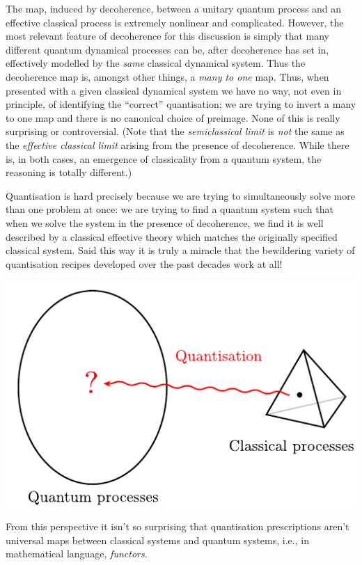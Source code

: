 \documentclass[11pt]{amsart}
\theoremstyle{plain}%
\theoremstyle{definition}
\theoremstyle{remark}
\begin{document}
The map, induced by decoherence, between a unitary quantum process and an effective classical process is extremely nonlinear and complicated. However, the most relevant feature of decoherence for this discussion is simply that many different quantum dynamical processes can be, after decoherence has set in, effectively modelled by the \emph{same} classical dynamical system. Thus the decoherence map is, amongst other things, a \emph{many to one} map. Thus, when presented with a given classical dynamical system we have no way, not even in principle, of identifying the ``correct'' quantisation; we are trying to invert a many to one map and there is no canonical choice of preimage.  None of this is really surprising or controversial. (Note that the \emph{semiclassical limit} is \emph{not} the same as the \emph{effective classical limit} arising from the presence of decoherence. While there is, in both cases, an emergence of classicality from a quantum system, the reasoning is totally different.)

Quantisation is hard precisely because we are trying to simultaneously solve more than one problem at once: we are trying to find a quantum system such that when we solve the system in the presence of decoherence, we find it is well described by a classical effective theory which matches the originally specified classical system. Said this way it is truly a miracle that the bewildering variety of quantisation recipes developed over the past decades work at all! 
\begin{center}
\includegraphics{Quantisation.pdf}
\end{center}
From this perspective it isn't so surprising that quantisation prescriptions aren't universal maps between classical systems and quantum systems, i.e., in mathematical language, \emph{functors}. 
\end{document}
